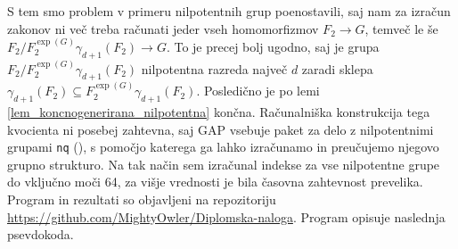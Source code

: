 S tem smo problem v primeru nilpotentnih grup poenostavili, saj nam za izračun zakonov ni več treba računati jeder vseh homomorfizmov $F_2 \to G$, temveč le še $F_2 / F_2^{\exp(G)}\gamma_{d+1}(F_2) \to G$.
To je precej bolj ugodno, saj je grupa $F_2 / F_2^{\exp(G)}\gamma_{d+1}(F_2)$ nilpotentna razreda največ $d$ zaradi sklepa $\gamma_{d+1}(F_2) \subseteq  F_2^{\exp(G)}\gamma_{d+1}(F_2)$.
Posledično je po lemi \ref{lem_koncnogenerirana_nilpotentna} končna.
Računalniška konstrukcija tega kvocienta ni posebej zahtevna, saj GAP vsebuje paket za delo z nilpotentnimi grupami \texttt{nq} (\cite{nq2.5.11}), s pomočjo katerega ga lahko izračunamo in preučujemo njegovo grupno strukturo.
Na tak način sem izračunal indekse za vse nilpotentne grupe do vključno moči 64, za višje vrednosti je bila časovna zahtevnost prevelika. Program in rezultati so objavljeni na repozitoriju \url{https://github.com/MightyOwler/Diplomska-naloga}.
Program opisuje naslednja psevdokoda. 

  

